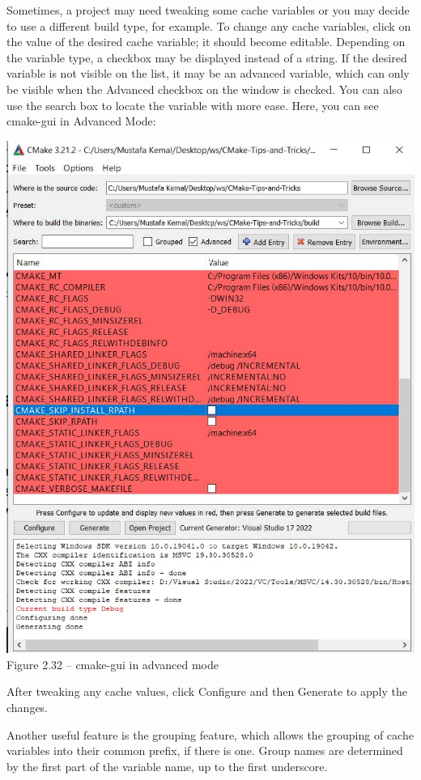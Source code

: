 Sometimes, a project may need tweaking some cache variables or you may decide to use a different build type, for example. To change any cache variables, click on the value of the desired cache variable; it should become editable. Depending on the variable type, a checkbox may be displayed instead of a string. If the desired variable is not visible on the list, it may be an advanced variable, which can only be visible when the Advanced checkbox on the window is checked. You can also use the search box to locate the variable with more ease. Here, you can see cmake-gui in Advanced Mode:

\begin{center}
\includegraphics[width=1.\textwidth]{content/1/chapter2/images/32.jpg}\\
Figure 2.32 – cmake-gui in advanced mode
\end{center}

After tweaking any cache values, click Configure and then Generate to apply the changes.

\begin{tcolorbox}[colback=webgreen!5!white,colframe=webgreen!75!black,title=Tip]
Another useful feature is the grouping feature, which allows the grouping of cache variables into their common prefix, if there is one. Group names are determined by the first part of the variable name, up to the first underscore.
\end{tcolorbox}

